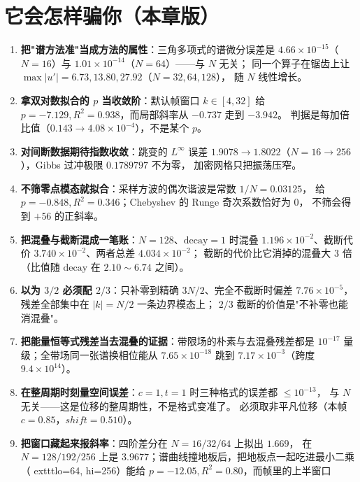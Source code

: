 

\section{它会怎样骗你（本章版）}

\begin{enumerate}
  \item \textbf{把"谱方法准"当成方法的属性}：三角多项式的谱微分误差是
        $4.66\times10^{-15}$（$N=16$）与 $1.01\times10^{-14}$（$N=64$）——与 $N$ 无关；
        同一个算子在锯齿上让 $\max|u'|=6.73,13.80,27.92$（$N=32,64,128$），
        随 $N$ 线性增长。
  \item \textbf{拿双对数拟合的 $p$ 当收敛阶}：默认帧窗口 $k\in[4,32]$ 给
        $p=-7.129,R^2=0.938$，而局部斜率从 $-0.737$ 走到 $-3.942$。
        判据是每加倍比值（$0.143\to4.08\times10^{-4}$），不是某个 $p$。
  \item \textbf{对间断数据期待指数收敛}：跳变的 $L^\infty$ 误差
        $1.9078\to1.8022$（$N=16\to256$），Gibbs 过冲极限 $0.1789797$ 不为零，
        加密网格只把振荡压窄。
  \item \textbf{不筛零点模态就拟合}：采样方波的偶次谐波是常数 $1/N=0.03125$，
        给 $p=-0.848,R^2=0.346$；Chebyshev 的 Runge 奇次系数恰好为 $0$，
        不筛会得到 $+56$ 的正斜率。
  \item \textbf{把混叠与截断混成一笔账}：$N=128$、$\mathrm{decay}=1$ 时混叠
        $1.196\times10^{-2}$、截断代价 $3.740\times10^{-2}$、两者总差 $4.034\times10^{-2}$；
        截断的代价比它消掉的混叠大 $3$ 倍（比值随 $\mathrm{decay}$ 在 $2.10\sim6.74$ 之间）。
  \item \textbf{以为 $3/2$ 必须配 $2/3$}：只补零到精确 $3N/2$、完全不截断时偏差
        $7.76\times10^{-5}$，残差全部集中在 $|k|=N/2$ 一条边界模态上；
        $2/3$ 截断的价值是"不补零也能消混叠"。
  \item \textbf{把能量恒等式残差当去混叠的证据}：带限场的朴素与去混叠残差都是
        $10^{-17}$ 量级；全带场同一张谱换相位能从 $7.65\times10^{-18}$ 跳到
        $7.17\times10^{-3}$（跨度 $9.4\times10^{14}$）。
  \item \textbf{在整周期时刻量空间误差}：$c=1,t=1$ 时三种格式的误差都 $\le10^{-13}$，
        与 $N$ 无关——这是位移的整周期性，不是格式变准了。
        必须取非平凡位移（本帧 $c=0.85$，$shift=0.510$）。
  \item \textbf{把窗口藏起来报斜率}：四阶差分在 $N=16/32/64$ 上拟出 $1.669$，
        在 $N=128/192/256$ 上是 $3.9677$；谱曲线撞地板后，把地板点一起吃进最小二乘
        （	exttt{lo=64, hi=256}）能给 $p=-12.05,R^2=0.80$，而帧里的上半窗口

\end{enumerate}
